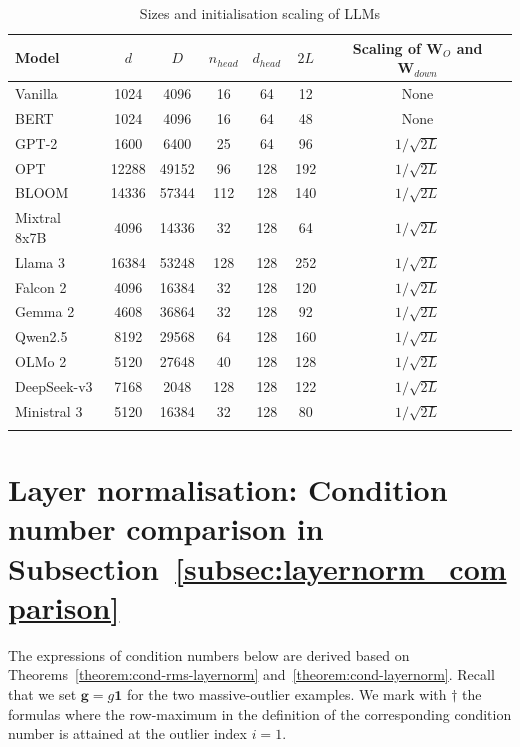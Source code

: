\documentclass[namedate,webpdf,imanum]{ima-authoring-template}
\newcommand{\Matrix}[1]{\mathbf{#1}}
\newcommand{\One}{\Matrix{1}}
\numberwithin{equation}{section}
\begin{document}
\begin{table}[th]
\caption{Sizes and initialisation scaling of LLMs}
\label{tab:LLM-sizes}
\begin{tabular}{@{}lcccccc@{}}
\toprule
Model & $d$ & $D$ & $n_{head}$ & $d_{head}$ & $2L$ & Scaling of $\Matrix{W}_O$ and $\Matrix{W}_{down}$ \\
\midrule
Vanilla \citep{vaswani2017attention}  & 1024  & 4096  & 16  & 64  & 12  & None \\
BERT \citep{devlin2019bert}           & 1024  & 4096  & 16  & 64  & 48  & None \\
GPT-2 \citep{radford2019language}     & 1600  & 6400  & 25  & 64  & 96  & $1 / \sqrt{2L}$ \\
OPT \citep{zhang2022opt}              & 12288 & 49152 & 96  & 128 & 192 & $1 / \sqrt{2L}$ \\
BLOOM \citep{scao2022bloom}           & 14336 & 57344 & 112 & 128 & 140 & $1 / \sqrt{2L}$ \\
Mixtral 8x7B \citep{jiang2024mixtral} & 4096  & 14336 & 32  & 128 & 64  & $1 / \sqrt{2L}$ \\
Llama 3 \citep{grattafiori2024llama}  & 16384 & 53248 & 128 & 128 & 252 & $1 / \sqrt{2L}$ \\
Falcon 2 \citep{malartic2024falcon2}  & 4096  & 16384 & 32  & 128 & 120 & $1 / \sqrt{2L}$ \\
Gemma 2 \citep{riviere2024gemma}      & 4608  & 36864 & 32  & 128 & 92  & $1 / \sqrt{2L}$ \\
Qwen2.5 \citep{yang2024qwen25}        & 8192  & 29568 & 64  & 128 & 160 & $1 / \sqrt{2L}$ \\
OLMo 2 \citep{walsh20252}             & 5120  & 27648 & 40  & 128 & 128 & $1 / \sqrt{2L}$ \\
DeepSeek-v3 \citep{liu2024deepseek}   & 7168  & 2048  & 128 & 128 & 122 & $1 / \sqrt{2L}$ \\
Ministral 3 \citep{liu2026mistral}    & 5120  & 16384 & 32  & 128 & 80  & $1 / \sqrt{2L}$ \\
\botrule
\end{tabular}
\end{table}

\section{Layer normalisation: Condition number comparison in Subsection~\ref{subsec:layernorm_comparison}}
\label{appendix:layernorm-cond-comparison}

The expressions of condition numbers below are derived based on Theorems~\ref{theorem:cond-rms-layernorm} and~\ref{theorem:cond-layernorm}.
Recall that we set $\Matrix{g} = g \One$ for the two massive-outlier examples.
We mark with $\dagger$ the formulas where the row-maximum in the definition of the corresponding condition number is attained at the outlier index $i = 1$.
\end{document}
